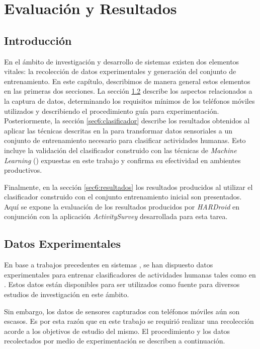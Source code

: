 
\chapter{Evaluación y Resultados}

\label{chap6:evaluacion}

\section{Introducción}

\label{sec6:introduccion}En el ámbito de investigación y desarrollo
de sistemas  existen dos elementos vitales: la recolección
de datos experimentales y generación del conjunto de entrenamiento.
En este capítulo, describimos de manera general estos elementos en
las primeras dos secciones. La sección \ref{sec6:datos-exp} describe
los aspectos relacionados a la captura de datos, determinando los
requisitos mínimos de los teléfonos móviles utilizados y describiendo
el procedimiento guía para experimentación. Posteriormente, la sección
\ref{sec6:clasificador} describe los resultados obtenidos al aplicar
las técnicas descritas en la  para
transformar datos sensoriales a un conjunto de entrenamiento necesario
para clasificar actividades humanas. Esto incluye la validación del
clasificador construido con las técnicas de \emph{Machine Learning}
() expuestas en este trabajo y confirma su efectividad en
ambientes productivos. 

Finalmente, en la sección \ref{sec6:resultados} los resultados producidos
al utilizar el clasificador construido con el conjunto entrenamiento
inicial son presentados. Aquí se expone la evaluación de los resultados
producidos por \emph{HARDroid }en conjunción con la aplicación \emph{ActivitySurvey}
desarrollada para esta tarea.

\section{Datos Experimentales}

\label{sec6:datos-exp}En base a trabajos precedentes en sistemas
, se han dispuesto datos experimentales para entrenar clasificadores
de actividades humanas tales como en \cite{ReyesOrtiz2013}. Estos
datos están disponibles para ser utilizados como fuente para diversos
estudios de investigación en este ámbito. 

Sin embargo, los datos de sensores capturados con teléfonos móviles
aún son escasos. Es por esta razón que en este trabajo se requirió
realizar una recolección acorde a los objetivos de estudio del mismo.
El procedimiento y los datos recolectados por medio de experimentación
se describen a continuación.

